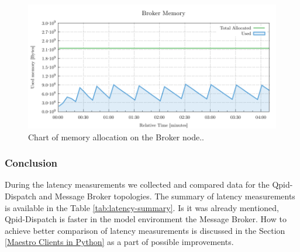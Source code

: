 \begin{figure}[H]
	\centering
	\includegraphics[width=1\linewidth]{obrazky-figures/charts/multipoint-router-broker-latency-memory.pdf}
	\caption{Chart of memory allocation on the Broker node..}
	\label{fig:latency-multiple-broker-memory}
\end{figure}

\subsubsection*{Conclusion}
During the latency measurements we collected and compared data for the Qpid-Dispatch and Message Broker topologies. The summary of latency measurements is available in the Table \ref{tab:latency-summary}. Is it was already mentioned, Qpid-Dispatch is faster in the model environment the Message Broker. How to achieve better comparison of latency measurements is discussed in the Section \ref{Maestro Clients in Python} as a part of possible improvements.

